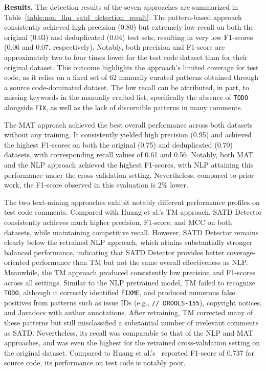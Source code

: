 

\textbf{Results.} The detection results of the seven approaches are summarized in Table~\ref{table:non_llm_satd_detection_result}. The pattern-based approach consistently achieved high precision (0.80) but extremely low recall on both the original (0.03) and deduplicated (0.04) test sets, resulting in very low F1-scores (0.06 and 0.07, respectively). Notably, both precision and F1-score are approximately two to four times lower for the test code dataset than for their original dataset. This outcome highlights the approach’s limited coverage for test code, as it relies on a fixed set of 62 manually curated patterns obtained through a source code-dominated dataset. The low recall can be attributed, in part, to missing keywords in the manually crafted list, specifically the absence of \texttt{TODO} alongside \texttt{FIX}, as well as the lack of discernible patterns in many comments.

The MAT approach achieved the best overall performance across both datasets without any training. It consistently yielded high precision (0.95) and achieved the highest F1-scores on both the original (0.75) and deduplicated (0.70) datasets, with corresponding recall values of 0.61 and 0.56. Notably, both MAT and the NLP approach achieved the highest F1-scores, with NLP attaining this performance under the cross-validation setting. Nevertheless, compared to prior work, the F1-score observed in this evaluation is 2\% lower.

The two text-mining approaches exhibit notably different performance profiles on test code comments. Compared with Huang et al.’s TM approach, SATD Detector consistently achieves much higher precision, F1-score, and MCC on both datasets, while maintaining competitive recall. However, SATD Detector remains clearly below the retrained NLP approach, which attains substantially stronger balanced performance, indicating that SATD Detector provides better coverage-oriented performance than TM but not the same overall effectiveness as NLP. Meanwhile, the TM approach produced consistently low precision and F1-scores across all settings. Similar to the NLP pretrained model, TM failed to recognize \texttt{TODO}, although it correctly identified \texttt{FIXME}, and produced numerous false positives from patterns such as issue IDs (e.g., \texttt{// DROOLS-155}), copyright notices, and Javadocs with author annotations. After retraining, TM corrected many of these patterns but still misclassified a substantial number of irrelevant comments as SATD. Nevertheless, its recall was comparable to that of the NLP and MAT approaches, and was even the highest for the retrained cross-validation setting on the original dataset. Compared to Huang et al.’s~\cite{huang_identifying_2018} reported F1-score of 0.737 for source code, its performance on test code is notably poor.

